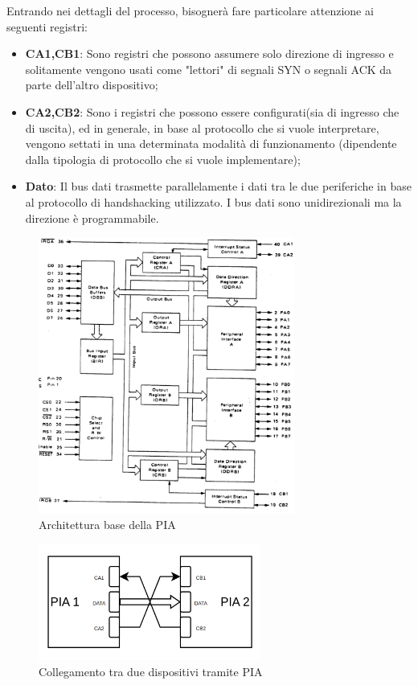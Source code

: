 Entrando nei dettagli del processo, bisognerà fare particolare attenzione ai seguenti registri:
\begin{itemize}
    \item \textbf{CA1,CB1}: Sono registri che possono assumere solo direzione di ingresso e solitamente vengono usati come "lettori" di segnali SYN o segnali ACK da parte dell'altro dispositivo;
    \item \textbf{CA2,CB2}: Sono i registri che possono essere configurati(sia di ingresso che di uscita), ed in generale, in base al protocollo che si vuole interpretare, vengono settati in una determinata modalità di funzionamento (dipendente dalla tipologia di protocollo che si vuole implementare);
    \item \textbf{Dato}: Il bus dati trasmette parallelamente i dati tra le due periferiche in base al protocollo di handshacking utilizzato. I bus dati sono unidirezionali ma la direzione è programmabile. 
\end{itemize}

\begin{figure}
    \centering
    \includegraphics[width=0.75\textwidth]{img/PIA-SCHEME.jpg}
    \caption{Architettura base della PIA}\label{img:PIA}
\end{figure}

\begin{figure}
    \centering
    \includegraphics[width=0.65\textwidth]{img/PIA-CON.png}
    \caption{Collegamento tra due dispositivi tramite PIA}\label{img:PIA-CON}
\end{figure}

